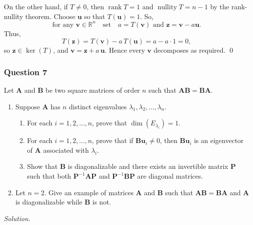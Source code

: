 \documentclass[12pt]{article}
\begin{document}
\begin{enumerate}[label=\textbf{(\alph*)}]
    On the other hand, if $T\ne 0$, then $\operatorname{rank}T=1$ and $\operatorname{nullity}T=n-1$ by the rank-nullity theorem. Choose $\mathbf{u}$ so that $T\left(\mathbf{u}\right)=1$. So, \[\text{for any }\mathbf{v}\in\mathbb{R}^n\quad\text{set}\quad a = T(\mathbf{v})\text{ and }\mathbf{z} = \mathbf{v} - a\mathbf{u}. \]
    Thus,
  \[
    T(\mathbf{z}) = T(\mathbf{v}) - a\,T(\mathbf{u}) = a - a\cdot1 = 0,
  \]
  so \(\mathbf{z}\in\ker(T)\), and \(\mathbf{v} = \mathbf{z} + a\,\mathbf{u}\).  Hence every \(\mathbf{v}\) decomposes as required. \qed 
\end{enumerate}

\subsubsection*{Question 7}
Let \(\mathbf{A}\) and \(\mathbf{B}\) be two square matrices of order \(n\) such that \(\mathbf{AB}=\mathbf{BA}\).
\begin{enumerate}[label=\textbf{(\alph*)}]
\itemsep 0em
    \item Suppose \(\mathbf{A}\) has \(n\) distinct eigenvalues \(\lambda_1, \lambda_2, \ldots, \lambda_n\).
    \begin{enumerate}[label=\textbf{(\roman*)}]
    \itemsep 0em
        \item For each \(i=1,2,\ldots,n\), prove that \(\dim(E_{\lambda_i})=1\).
        
        \item For each \(i=1,2,\ldots,n\), prove that if \(\mathbf{Bu}_i \neq 0\), then \(\mathbf{Bu}_i\) is an eigenvector of \(\mathbf{A}\) associated with \(\lambda_i\).
        
        \item Show that \(\mathbf{B}\) is diagonalizable and there exists an invertible matrix \(\mathbf{P}\) such that both \(\mathbf{P}^{-1}\mathbf{AP}\) and \(\mathbf{P}^{-1}\mathbf{BP}\) are diagonal matrices.
    \end{enumerate}
    \item Let \(n=2\). Give an example of matrices \(\mathbf{A}\) and \(\mathbf{B}\) such that \(\mathbf{AB}=\mathbf{BA}\) and \(\mathbf{A}\) is diagonalizable while \(\mathbf{B}\) is not.
\end{enumerate}
\noindent\emph{Solution.}
\end{document}

